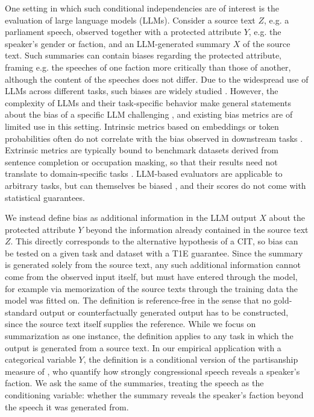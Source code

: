 \documentclass[twoside,11pt]{article}
\begin{document}
One setting in which such conditional independencies are of interest is the evaluation of large language models (LLMs). Consider a source text $Z$, e.g. a parliament speech, observed together with a protected attribute $Y$, e.g. the speaker's gender or faction, and an LLM-generated summary $X$ of the source text.
Such summaries can contain biases regarding the protected attribute, framing e.g. the speeches of one faction more critically than those of another, although the content of the speeches does not differ.
Due to the widespread use of LLMs across different tasks, such biases are widely studied \citep{gallegos2024bias}.
However, the complexity of LLMs and their task-specific behavior make general statements about the bias of a specific LLM challenging \citep{anthis2024impossibility}, and existing bias metrics are of limited use in this setting.
Intrinsic metrics based on embeddings or token probabilities often do not correlate with the bias observed in downstream tasks \citep{goldfarb2020intrinsic, delobelle2022measuring}.
Extrinsic metrics are typically bound to benchmark datasets derived from sentence completion or occupation masking, so that their results need not translate to domain-specific tasks \citep{li2023survey}.
LLM-based evaluators are applicable to arbitrary tasks, but can themselves be biased \citep{sun2022bertscore, gao2025llm}, and their scores do not come with statistical guarantees.

We instead define bias as additional information in the LLM output $X$ about the protected attribute $Y$ beyond the information already contained in the source text $Z$. This directly corresponds to the alternative hypothesis of a CIT, so bias can be tested on a given task and dataset with a T1E guarantee.
Since the summary is generated solely from the source text, any such additional information cannot come from the observed input itself, but must have entered through the model, for example via memorization of the source texts through the training data the model was fitted on.
The definition is reference-free in the sense that no gold-standard output or counterfactually generated output has to be constructed, since the source text itself supplies the reference. While we focus on summarization as one instance, the definition applies to any task in which the output is generated from a source text.
In our empirical application with a categorical variable $Y$, the definition is a conditional version of the partisanship measure of \citet{gentzkow2019measuring}, who quantify how strongly congressional speech reveals a speaker's faction. We ask the same of the summaries, treating the speech as the conditioning variable: whether the summary reveals the speaker's faction beyond the speech it was generated from.
\end{document}
